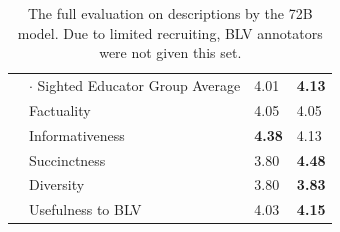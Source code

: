 \begin{table}
\begin{tabular}{llll}
        & $\cdot$ Sighted Educator Group Average        & 4.01 & \textbf{4.13} \\
        & Factuality                                    & 4.05 & 4.05 \\
        & Informativeness                               & \textbf{4.38} & 4.13 \\
        & Succinctness                                  & 3.80 & \textbf{4.48} \\
        & Diversity                                     & 3.80 & \textbf{3.83} \\
        & Usefulness to BLV                             & 4.03 & \textbf{4.15} \\

     

    \bottomrule
    \end{tabular}
\caption{The full evaluation on descriptions by the 72B model. Due to limited recruiting, BLV annotators were not given this set.}\label{tab:big1b}
\end{table}



